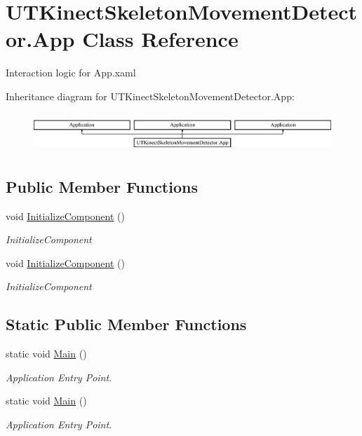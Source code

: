 \hypertarget{classUTKinectSkeletonMovementDetector_1_1App}{\section{U\-T\-Kinect\-Skeleton\-Movement\-Detector.\-App Class Reference}
\label{classUTKinectSkeletonMovementDetector_1_1App}
}


Interaction logic for App.\-xaml  


Inheritance diagram for U\-T\-Kinect\-Skeleton\-Movement\-Detector.\-App\-:\begin{figure}[H]
\begin{center}
\leavevmode
\includegraphics[height=1.487384cm]{classUTKinectSkeletonMovementDetector_1_1App}
\end{center}
\end{figure}
\subsection*{Public Member Functions}
\begin{DoxyCompactItemize}
\item 
void \hyperlink{classUTKinectSkeletonMovementDetector_1_1App_ad4f6df536dd24c00b8fdd75c73eb0988}{Initialize\-Component} ()
\begin{DoxyCompactList}\small\item\em Initialize\-Component \end{DoxyCompactList}\item 
void \hyperlink{classUTKinectSkeletonMovementDetector_1_1App_ad4f6df536dd24c00b8fdd75c73eb0988}{Initialize\-Component} ()
\begin{DoxyCompactList}\small\item\em Initialize\-Component \end{DoxyCompactList}\end{DoxyCompactItemize}
\subsection*{Static Public Member Functions}
\begin{DoxyCompactItemize}
\item 
static void \hyperlink{classUTKinectSkeletonMovementDetector_1_1App_acdb1c09f47bfad48eae6c3926122db28}{Main} ()
\begin{DoxyCompactList}\small\item\em Application Entry Point. \end{DoxyCompactList}\item 
static void \hyperlink{classUTKinectSkeletonMovementDetector_1_1App_acdb1c09f47bfad48eae6c3926122db28}{Main} ()
\begin{DoxyCompactList}\small\item\em Application Entry Point. \end{DoxyCompactList}\end{DoxyCompactItemize}


